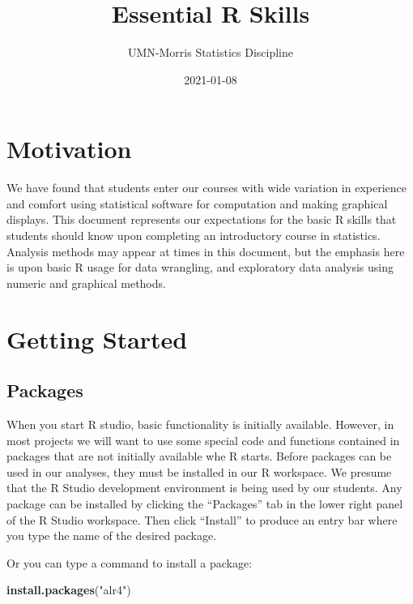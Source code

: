 \documentclass[
]{book}
\title{Essential R Skills}
\author{UMN-Morris Statistics Discipline}
\date{2021-01-08}
\newenvironment{Shaded}{\begin{snugshade}}{\end{snugshade}}
\newcommand{\KeywordTok}[1]{\textcolor[rgb]{0.13,0.29,0.53}{\textbf{#1}}}
\newcommand{\NormalTok}[1]{#1}
\newcommand{\StringTok}[1]{\textcolor[rgb]{0.31,0.60,0.02}{#1}}
\begin{document}
\maketitle

{
\setcounter{tocdepth}{1}
\tableofcontents
}
\hypertarget{motivation}{%
\chapter{Motivation}\label{motivation}}

We have found that students enter our courses with wide variation in experience and comfort using statistical software for computation and making graphical displays. This document represents our expectations for the basic R skills that students should know upon completing an introductory course in statistics. Analysis methods may appear at times in this document, but the emphasis here is upon basic R usage for data wrangling, and exploratory data analysis using numeric and graphical methods.

\hypertarget{GettingStarted}{%
\chapter{Getting Started}\label{GettingStarted}}

\hypertarget{packages}{%
\section{Packages}\label{packages}}

When you start R studio, basic functionality is initially available. However, in most projects we will want to use some special code and functions contained in packages that are not initially available whe R starts. Before packages can be used in our analyses, they must be installed in our R workspace. We presume that the R Studio development environment is being used by our students. Any package can be installed by clicking the ``Packages'' tab in the lower right panel of the R Studio workspace. Then click ``Install'' to produce an entry bar where you type the name of the desired package.

Or you can type a command to install a package:

\begin{Shaded}
\begin{Highlighting}[]
\KeywordTok{install.packages}\NormalTok{(}\StringTok{"alr4"}\NormalTok{)}
\end{Highlighting}
\end{Shaded}
\end{document}
